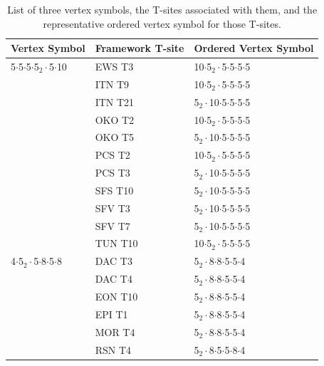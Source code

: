 \documentclass[preprint,numrefs,noinfo,sort&compress]{elsarticle}
\begin{document}
\begin{table}
\centering
\begin{threeparttable}
\caption{List of three vertex symbols, the T-sites associated with them, and the representative ordered vertex symbol for those T-sites. \label{tab:ov}}
{\scriptsize
\begin{tabular}{lll}
\hline
Vertex Symbol & Framework T-site & Ordered Vertex Symbol\\
\hline
5\(\cdot\)5\(\cdot\)5\(\cdot\)5\(_{\text{2}} \cdot\)5\(\cdot\)10 & EWS T3 & 10\(\cdot\)5\(_{\text{2}} \cdot\)5\(\cdot\)5\(\cdot\)5\(\cdot\)5\\
 & ITN T9 & 10\(\cdot\)5\(_{\text{2}} \cdot\)5\(\cdot\)5\(\cdot\)5\(\cdot\)5\\
 & ITN T21 & 5\(_{\text{2}} \cdot\)10\(\cdot\)5\(\cdot\)5\(\cdot\)5\(\cdot\)5\\
 & OKO T2 & 10\(\cdot\)5\(_{\text{2}} \cdot\)5\(\cdot\)5\(\cdot\)5\(\cdot\)5\\
 & OKO T5 & 5\(_{\text{2}} \cdot\)10\(\cdot\)5\(\cdot\)5\(\cdot\)5\(\cdot\)5\\
 & PCS T2 & 10\(\cdot\)5\(_{\text{2}} \cdot\)5\(\cdot\)5\(\cdot\)5\(\cdot\)5\\
 & PCS T3 & 5\(_{\text{2}} \cdot\)10\(\cdot\)5\(\cdot\)5\(\cdot\)5\(\cdot\)5\\
 & SFS T10 & 5\(_{\text{2}} \cdot\)10\(\cdot\)5\(\cdot\)5\(\cdot\)5\(\cdot\)5\\
 & SFV T3 & 5\(_{\text{2}} \cdot\)10\(\cdot\)5\(\cdot\)5\(\cdot\)5\(\cdot\)5\\
 & SFV T7 & 5\(_{\text{2}} \cdot\)10\(\cdot\)5\(\cdot\)5\(\cdot\)5\(\cdot\)5\\
 & TUN T10 & 10\(\cdot\)5\(_{\text{2}} \cdot\)5\(\cdot\)5\(\cdot\)5\(\cdot\)5\\
\hline
4\(\cdot\)5\(_{\text{2}} \cdot\)5\(\cdot\)8\(\cdot\)5\(\cdot\)8 & DAC T3 & 5\(_{\text{2}} \cdot\)8\(\cdot\)8\(\cdot\)5\(\cdot\)5\(\cdot\)4\\
 & DAC T4 & 5\(_{\text{2}} \cdot\)8\(\cdot\)8\(\cdot\)5\(\cdot\)5\(\cdot\)4\\
 & EON T10 & 5\(_{\text{2}} \cdot\)8\(\cdot\)8\(\cdot\)5\(\cdot\)5\(\cdot\)4\\
 & EPI T1 & 5\(_{\text{2}} \cdot\)8\(\cdot\)8\(\cdot\)5\(\cdot\)5\(\cdot\)4\\
 & MOR T4 & 5\(_{\text{2}} \cdot\)8\(\cdot\)8\(\cdot\)5\(\cdot\)5\(\cdot\)4\\
 & RSN T4 & 5\(_{\text{2}} \cdot\)8\(\cdot\)5\(\cdot\)5\(\cdot\)8\(\cdot\)4\\

\end{tabular}}
\end{threeparttable}
\end{table}
\end{document}
